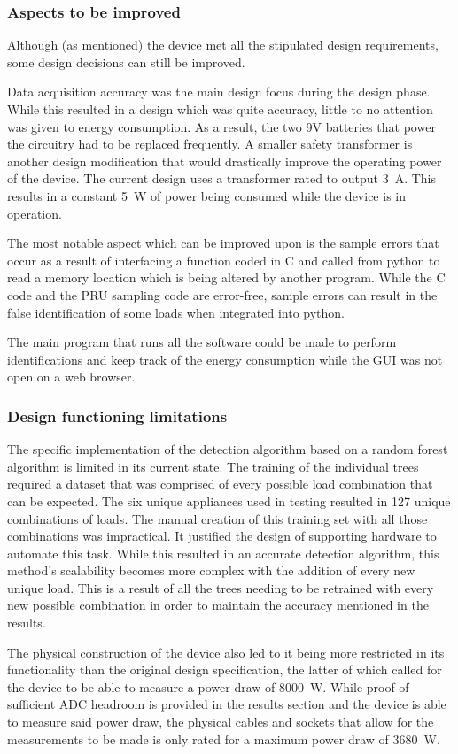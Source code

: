 \subsubsection{Aspects to be improved}
Although (as mentioned) the device met all the stipulated design requirements, some design decisions can still be improved.
\par
Data acquisition accuracy was the main design focus during the design phase. While this resulted in a design which was quite accuracy, little to no attention was given to energy consumption. As a result, the two 9V batteries that power the circuitry had to be replaced frequently. A smaller safety transformer is another design modification that would drastically improve the operating power of the device. The current design uses a transformer rated to output \qty{3}{\ampere}. This results in a constant \qty{5}{\watt} of power being consumed while the device is in operation.
\par
The most notable aspect which can be improved upon is the sample errors that occur as a result of interfacing a function coded in C and called from python to read a memory location which is being altered by another program. While the C code and the PRU sampling code are error-free, sample errors can result in the false identification of some loads when integrated into python.
\par
The main program that runs all the software could be made to perform identifications and keep track of the energy consumption while the GUI was not open on a web browser.


\subsubsection{Design functioning limitations}
The specific implementation of the detection algorithm based on a random forest algorithm is limited in its current state. The training of the individual trees required a dataset that was comprised of every possible load combination that can be expected. The six unique appliances used in testing resulted in 127 unique combinations of loads. The manual creation of this training set with all those combinations was impractical. It justified the design of supporting hardware to automate this task. While this resulted in an accurate detection algorithm, this method's scalability becomes more complex with the addition of every new unique load. This is a result of all the trees needing to be retrained with every new possible combination in order to maintain the accuracy mentioned in the results. 
\par
The physical construction of the device also led to it being more restricted in its functionality than the original design specification, the latter of which called for the device to be able to measure a power draw of \qty{8000}{\watt}. While proof of sufficient ADC headroom is provided in the results section and the device is able to measure said power draw, the physical cables and sockets that allow for the measurements to be made is only rated for a maximum power draw of \qty{3680}{\watt}.   


